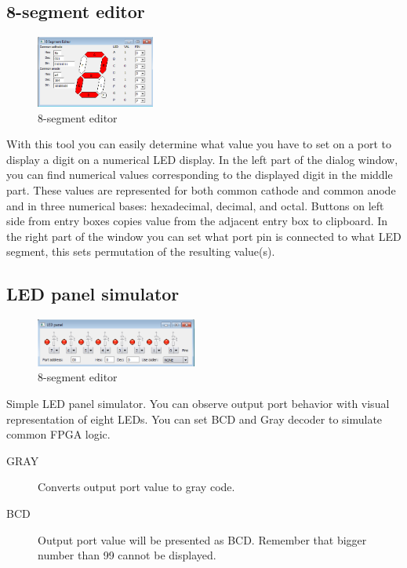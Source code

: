 \subsection{8-segment editor}
    \begin{figure}
        \centering{}
        \includegraphics[width=110pt]{img/8segment.png}
        \caption{8-segment editor}
    \end{figure}
    With this tool you can easily determine what value you have to set on a port to display a digit on a numerical LED
    display. In the left part of the dialog window, you can find numerical values corresponding to the displayed digit
    in the middle part. These values are represented for both common cathode and common anode and in three numerical
    bases: hexadecimal, decimal, and octal. Buttons on left side from entry boxes copies value from the adjacent entry
    box to clipboard. In the right part of the window you can set what port pin is connected to what LED segment, this
    sets permutation of the resulting value(s).

\subsection{LED panel simulator}
    \begin{figure}
        \centering{}
        \includegraphics[width=150pt]{img/Led_panel.png}
        \caption{8-segment editor}
    \end{figure}

    Simple LED panel simulator. You can observe output port behavior with visual representation of eight LEDs. You can
    set BCD and Gray decoder to simulate common FPGA logic.

    \begin{description}
        \item[GRAY] Converts output port value to gray code.
        \item[BCD] Output port value will be presented as BCD. Remember that bigger number than 99 cannot be displayed.
    \end{description}

